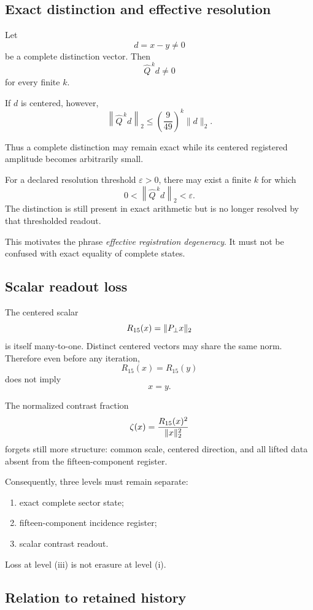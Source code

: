 \subsection{Exact distinction and effective resolution}

Let
\[
d=x-y\neq0
\]
be a complete distinction vector.  Then
\[
\widehat{Q}^{\,k}d\neq0
\]
for every finite \(k\).

If \(d\) is centered, however,
\[
\left\|
\widehat{Q}^{\,k}d
\right\|_2
\le
\left(\frac{9}{49}\right)^k
\|d\|_2.
\]

Thus a complete distinction may remain exact while its centered
registered amplitude becomes arbitrarily small.

For a declared resolution threshold
\(\varepsilon>0\), there may exist a finite \(k\) for which
\[
0
<
\left\|
\widehat{Q}^{\,k}d
\right\|_2
<
\varepsilon.
\]
The distinction is still present in exact arithmetic but is no
longer resolved by that thresholded readout.

This motivates the phrase
\emph{effective registration degeneracy}.  It must not be confused
with exact equality of complete states.

\subsection{Scalar readout loss}

The centered scalar
\[
R_{15}(x)
=
\|P_{\perp} x\|_2
\]
is itself many-to-one.  Distinct centered vectors may share the same
norm.  Therefore even before any iteration,
\[
R_{15}(x)=R_{15}(y)
\]
does not imply
\[
x=y.
\]

The normalized contrast fraction
\[
\zeta(x)
=
\frac{R_{15}(x)^2}{\|x\|_2^2}
\]
forgets still more structure: common scale, centered direction, and
all lifted data absent from the fifteen-component register.

Consequently, three levels must remain separate:

\begin{enumerate}[label=(\roman*)]
\item exact complete sector state;
\item fifteen-component incidence register;
\item scalar contrast readout.
\end{enumerate}

Loss at level (iii) is not erasure at level (i).

\subsection{Relation to retained history}


